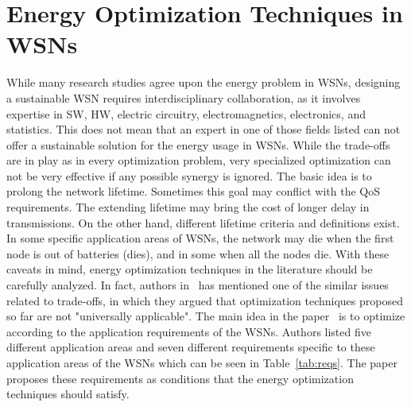 \documentclass[12pt, oneandhalf, chaparabic, sees, ms]{metu}
\begin{document}
\section{Energy Optimization Techniques in WSNs}\label{senergy-opt}
While many research studies agree upon the energy problem in WSNs, designing a sustainable WSN requires interdisciplinary collaboration, 
as it involves expertise in SW, HW, electric circuitry, electromagnetics, electronics, and statistics. 
This does not mean that an expert in one of those fields listed can not offer a sustainable solution for the energy usage in WSNs. While the trade-offs are in play as in every 
optimization problem, very specialized optimization can not be very effective if any possible synergy is ignored. The basic idea is to prolong the network lifetime. 
Sometimes this goal may conflict with the QoS requirements. The extending lifetime may bring the cost of longer delay in transmissions. 
On the other hand, different lifetime criteria and definitions exist. In some specific application areas of WSNs, the network may die when the first node is out of batteries (dies), 
and in some when all the nodes die. 
With these caveats in mind, energy optimization techniques
in the literature should be carefully analyzed. In fact, authors in~\cite{rault2014} has mentioned one of the similar issues related to trade-offs, in which they argued that
optimization techniques proposed so far are not "universally applicable". The main idea in the paper~\cite{rault2014} is to optimize according 
to the application requirements of the WSNs. Authors listed five different application areas and seven different requirements specific to these application areas of the WSNs which can be seen in Table~\ref{tab:reqs}. The paper proposes these requirements as conditions that the energy optimization techniques should satisfy.
\end{document}
